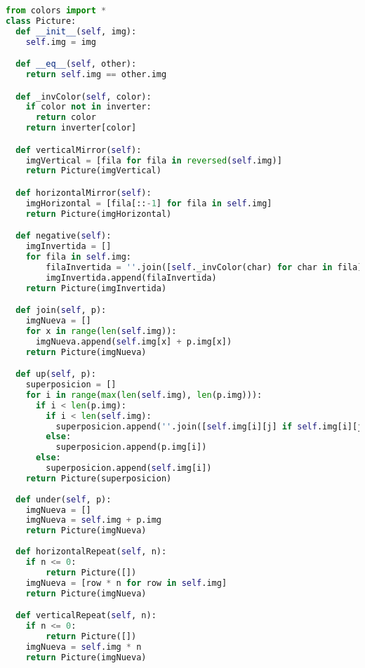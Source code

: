 \documentclass{article}
\begin{document}
        \begin{lstlisting}[language=Python, caption=EJERCICIOS I]
from colors import *
class Picture:
  def __init__(self, img):
    self.img = img

  def __eq__(self, other):
    return self.img == other.img

  def _invColor(self, color):
    if color not in inverter: 
      return color
    return inverter[color]

  def verticalMirror(self):
    imgVertical = [fila for fila in reversed(self.img)]
    return Picture(imgVertical)

  def horizontalMirror(self):
    imgHorizontal = [fila[::-1] for fila in self.img]
    return Picture(imgHorizontal)

  def negative(self):
    imgInvertida = []
    for fila in self.img:
        filaInvertida = ''.join([self._invColor(char) for char in fila])
        imgInvertida.append(filaInvertida)
    return Picture(imgInvertida)

  def join(self, p):
    imgNueva = []
    for x in range(len(self.img)):
      imgNueva.append(self.img[x] + p.img[x])
    return Picture(imgNueva)

  def up(self, p):
    superposicion = []
    for i in range(max(len(self.img), len(p.img))):
      if i < len(p.img):
        if i < len(self.img):
          superposicion.append(''.join([self.img[i][j] if self.img[i][j] != ' ' else p.img[i][j] for j in range(max(len(self.img[i]), len(p.img[i]))) ]))
        else:
          superposicion.append(p.img[i])
      else:
        superposicion.append(self.img[i])
    return Picture(superposicion)
 
  def under(self, p):
    imgNueva = []
    imgNueva = self.img + p.img
    return Picture(imgNueva)
  
  def horizontalRepeat(self, n):
    if n <= 0:
        return Picture([])
    imgNueva = [row * n for row in self.img]
    return Picture(imgNueva)

  def verticalRepeat(self, n):
    if n <= 0:
        return Picture([]) 
    imgNueva = self.img * n 
    return Picture(imgNueva)
        
        
        \end{lstlisting}  
            
\end{document}
